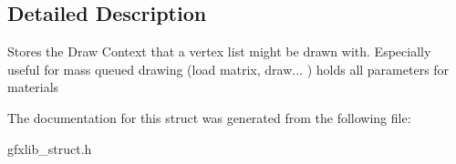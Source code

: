 \subsection{Detailed Description}
Stores the Draw Context that a vertex list might be drawn with. Especially useful for mass queued drawing (load matrix, draw... ) holds all parameters for materials 

The documentation for this struct was generated from the following file\+:\begin{DoxyCompactItemize}
\item 
gfxlib\+\_\+struct.\+h\end{DoxyCompactItemize}

